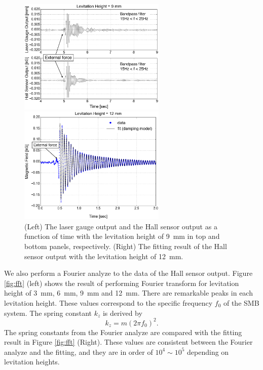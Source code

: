 \documentclass[a4paper]{jpconf}
\begin{document}
\begin{figure}[htbp]
  \centering
  \begin{minipage}{0.45\hsize}
  \includegraphics[width=70mm]{vibration_up.eps}
  \end{minipage}
  \begin{minipage}{0.45\hsize}
    \centering
    \includegraphics[width=70mm]{vibration_fit.eps}
  \end{minipage}
  \caption{(Left) The laser gauge output and the Hall sensor output as a function of time with the levitation height of 9~mm in top and bottom panels, respectively.
    (Right) The fitting result of the Hall sensor output with the levitation height of 12~mm.}
  \label{fig:vibration}
\end{figure}

We also perform a Fourier analyze to the data of the Hall sensor output.
Figure \ref{fig:fft} (left) shows the result of performing Fourier transform for levitation height of 3~mm, 6~mm, 9~mm and 12~mm.
There are remarkable peaks in each levitation height.
These values correspond to the specific frequency $f_{0}$ of the SMB system.
The spring constant $k_{z}$ is derived by
\begin{equation}
  k_{z} = m (2 \pi f_{0})^{2}.
\end{equation}
The spring constants from the Fourier analyze are compared with the fitting result in Figure \ref{fig:fft} (Right).
These values are consistent between the Fourier analyze and the fitting, and they are in order of $10^{4} \sim 10^{5}$ depending on levitation heights.
\end{document}

